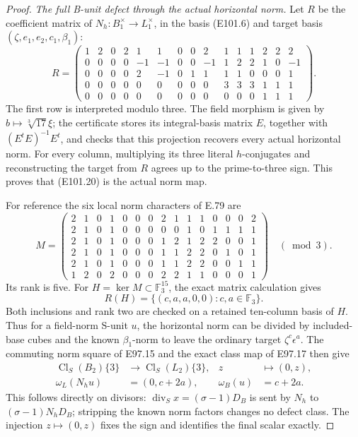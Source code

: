 \begin{proof}
\emph{The full B-unit defect through the actual horizontal norm.}
Let \(R\) be the coefficient matrix of
\(N_h:B_1^\times\to L_1^\times\), in the basis
(E101.6) and target basis \((\zeta,e_1,e_2,c_1,\beta_1)\):
\[
 R=\left(\begin{array}{*{15}{r}}
 1&2&0&2&1&1&0&0&2&1&1&1&2&2&2\\
 0&0&0&0&-1&-1&0&0&-1&1&2&2&1&0&-1\\
 0&0&0&0&2&-1&0&1&1&1&1&0&0&0&1\\
 0&0&0&0&0&0&0&0&0&3&3&3&1&1&1\\
 0&0&0&0&0&0&0&0&0&0&0&0&1&1&1
 \end{array}\right).
 \tag{E101.20}
\]
The first row is interpreted modulo three.
The field morphism is given by
\(b\mapsto\sqrt[3]{17}\xi\); the certificate stores
its integral-basis matrix \(E\), together with
\((E^tE)^{-1}E^t\), and checks that this projection
recovers every actual horizontal norm.
For every column, multiplying its three literal
\(h\)-conjugates and reconstructing the target from
\(R\) agrees up to the prime-to-three sign.
This proves that (E101.20) is the actual norm map.

For reference the six local norm characters of E.79 are
\[
 M=\left(\begin{array}{*{15}{r}}
 2&1&0&1&0&0&0&2&1&1&1&0&0&0&2\\
 2&1&0&1&0&0&0&0&0&1&0&1&1&1&1\\
 2&1&0&1&0&0&0&1&2&1&2&2&0&0&1\\
 2&1&0&1&0&0&0&1&1&2&2&0&1&0&1\\
 2&1&0&1&0&0&0&1&1&2&2&0&0&1&1\\
 1&2&0&2&0&0&0&2&2&1&1&0&0&0&1
 \end{array}\right)\quad(\bmod3).
 \tag{E101.21}
\]
Its rank is five. For \(H=\ker M\subset\mathbb F_3^{15}\),
the exact matrix calculation gives
\[
        R(H)=\{(c,a,a,0,0):c,a\in\mathbb F_3\}.
 \tag{E101.22}
\]
Both inclusions and rank two are checked on a retained
ten-column basis of \(H\). Thus for a field-norm
S-unit \(u\), the horizontal norm can be divided by
included-base cubes and the known \(\beta_1\)-norm to
leave the ordinary target \(\zeta^c\epsilon^a\).
The commuting norm square of E97.15 and the exact
class map of E97.17 then give
\[
 \begin{aligned}
 \operatorname{Cl}_S(B_2)\{3\}&\longrightarrow
       \operatorname{Cl}_S(L_2)\{3\},&z&\longmapsto(0,z),\\
 \omega_L(N_hu)&=(0,c+2a),&
 \omega_B(u)&=c+2a.
 \end{aligned}
 \tag{E101.23}
\]
This follows directly on divisors:
\(\operatorname{div}_S x=(\sigma-1)D_B\) is sent by
\(N_h\) to \((\sigma-1)N_hD_B\); stripping the known
norm factors changes no defect class.
The injection \(z\mapsto(0,z)\) fixes the sign and
identifies the final scalar exactly.


\end{proof}
